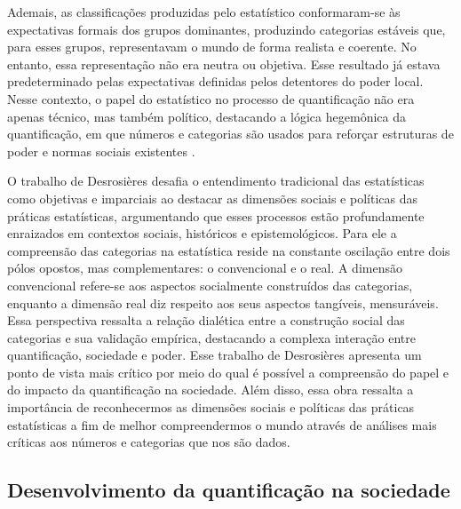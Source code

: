 Ademais, as classificações produzidas pelo estatístico conformaram-se às expectativas formais dos grupos dominantes, produzindo categorias estáveis que, para esses grupos, representavam o mundo de forma realista e coerente. No entanto, essa representação não era neutra ou objetiva. Esse resultado já estava predeterminado pelas expectativas definidas pelos detentores do poder local. Nesse contexto, o papel do estatístico no processo de quantificação não era apenas técnico, mas também político, destacando a lógica hegemônica da quantificação, em que números e categorias são usados para reforçar estruturas de poder e normas sociais existentes \cite{salais2016quantification}.

O trabalho de Desrosières desafia o entendimento tradicional das estatísticas como objetivas e imparciais ao destacar as dimensões sociais e políticas das práticas estatísticas, argumentando que esses processos estão profundamente enraizados em contextos sociais, históricos e epistemológicos. Para ele a compreensão das categorias na estatística reside na constante oscilação entre dois pólos opostos, mas complementares: o convencional e o real. A dimensão convencional refere-se aos aspectos socialmente construídos das categorias, enquanto a dimensão real diz respeito aos seus aspectos tangíveis, mensuráveis. Essa perspectiva ressalta a relação dialética entre a construção social das categorias e sua validação empírica, destacando a complexa interação entre quantificação, sociedade e poder. Esse trabalho de Desrosières apresenta um ponto de vista mais crítico por meio do qual é possível a compreensão do papel e do impacto da quantificação na sociedade. Além disso, essa obra ressalta a importância de reconhecermos as dimensões sociais e políticas das práticas estatísticas a fim de melhor compreendermos o mundo através de análises mais críticas aos números e categorias que nos são dados.

\subsection{Desenvolvimento da quantificação na sociedade}

